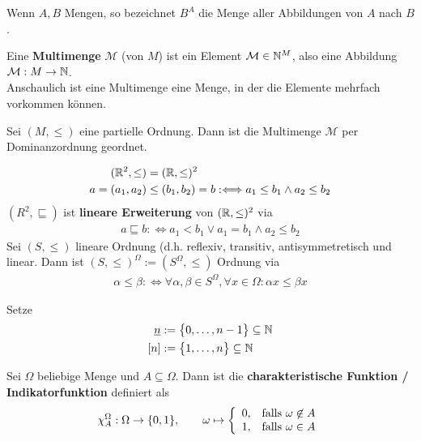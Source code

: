 \begin{notation}
    Wenn $A,B$ Mengen, so bezeichnet $B^A$ die Menge aller Abbildungen von $A$ nach $B$.
\end{notation}

\begin{definition}
Eine \textbf{Multimenge} $\mathcal{M}$ (von $M$) ist ein Element $\mathcal{M}\in\mathbb{N}^M$, also eine Abbildung $\mathcal{M}:M\to\mathbb{N}$.\\
Anschaulich ist eine Multimenge eine Menge, in der die Elemente mehrfach vorkommen können.
\end{definition}

\begin{lemma}
Sei $(M,\leq)$ eine partielle Ordnung. Dann ist die Multimenge $\mathcal{M}$ per Dominanzordnung geordnet.
\end{lemma}

\begin{beispiel}
\begin{align*}
(\mathbb{R}^2,\leq)&=(\mathbb{R},\leq)^2\\
a=(a_1,a_2)&\leq(b_1,b_2)=b:\Longleftrightarrow a_1\leq b_1\wedge a_2\leq b_2
\end{align*}
$(R^2,\sqsubseteq)$ ist \textbf{lineare Erweiterung} von $(\mathbb{R},\leq)^2$ via 
\begin{align*}
a\sqsubseteq b:\Longleftrightarrow a_1<b_1\vee a_1=b_1\wedge a_2\leq b_2
\end{align*}
Sei $(S,\leq)$ lineare Ordnung (d.h. reflexiv, transitiv, antisymmetretisch und linear. Dann ist $(S,\leq)^\Omega:=(S^\Omega,\leq)$ Ordnung via
\begin{align*}
\alpha\leq\beta:\Longleftrightarrow\forall\alpha,\beta\in S^\Omega,\forall x\in\Omega:\alpha x\leq\beta x
\end{align*}
\end{beispiel}

\begin{notation}
Setze
\begin{align*}
\underline{n}&:=\big\lbrace 0,\ldots,n-1\big\rbrace\subseteq\mathbb{N}\\
[n]&:=\big\lbrace1,\ldots,n\big\rbrace\subseteq\mathbb{N}
\end{align*}
\end{notation}

\begin{definition}
Sei $\Omega$ beliebige Menge und $A\subseteq\Omega$. Dann ist die \textbf{charakteristische Funktion / Indikatorfunktion} definiert als
\begin{align*}
\chi_A^\Omega:\Omega\to\lbrace0,1\rbrace,\qquad\omega\mapsto\left\lbrace\begin{array}{cl}
0, & \text{falls } \omega\not\in A\\
1, &\text{falls }\omega\in A
\end{array}\right.
\end{align*}
\end{definition}

